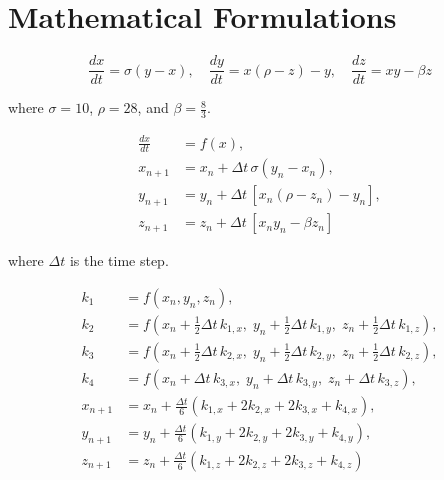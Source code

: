 \section{Mathematical Formulations}

\begin{equation}\label{eq:lorenz}
\frac{dx}{dt} = \sigma(y - x), \quad
\frac{dy}{dt} = x(\rho - z) - y, \quad
\frac{dz}{dt} = xy - \beta z
\end{equation}

\begin{center}
where $\sigma = 10$, $\rho = 28$, and $\beta = \frac{8}{3}$.
\end{center}


\begin{equation}\label{eq:euler_lorenz}
    \begin{aligned}
    \frac{dx}{dt} &= f(x), \\
    x_{n+1} &= x_n + \Delta t\, \sigma (y_n - x_n), \\
    y_{n+1} &= y_n + \Delta t\, [x_n(\rho - z_n) - y_n], \\
    z_{n+1} &= z_n + \Delta t\, [x_n y_n - \beta z_n]
    \end{aligned}
    \end{equation}
    
    \begin{center}
    where $\Delta t$ is the time step.
\end{center}
    
\begin{equation}
    \begin{aligned}
    k_1 &= f(x_n, y_n, z_n), \\
    k_2 &= f\left(x_n + \tfrac{1}{2} \Delta t\, k_{1,x},\; y_n + \tfrac{1}{2} \Delta t\, k_{1,y},\; z_n + \tfrac{1}{2} \Delta t\, k_{1,z} \right), \\
    k_3 &= f\left(x_n + \tfrac{1}{2} \Delta t\, k_{2,x},\; y_n + \tfrac{1}{2} \Delta t\, k_{2,y},\; z_n + \tfrac{1}{2} \Delta t\, k_{2,z} \right), \\
    k_4 &= f\left(x_n + \Delta t\, k_{3,x},\; y_n + \Delta t\, k_{3,y},\; z_n + \Delta t\, k_{3,z} \right), \\
    x_{n+1} &= x_n + \frac{\Delta t}{6} \left( k_{1,x} + 2k_{2,x} + 2k_{3,x} + k_{4,x} \right), \\
    y_{n+1} &= y_n + \frac{\Delta t}{6} \left( k_{1,y} + 2k_{2,y} + 2k_{3,y} + k_{4,y} \right), \\
    z_{n+1} &= z_n + \frac{\Delta t}{6} \left( k_{1,z} + 2k_{2,z} + 2k_{3,z} + k_{4,z} \right)
    \label{eq:rk4_lorenz}
    \end{aligned}
\end{equation}
    

